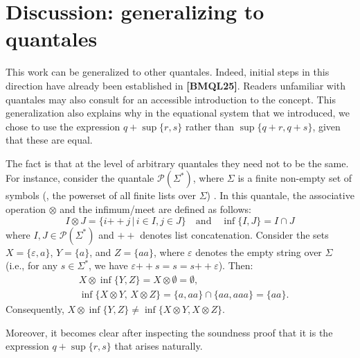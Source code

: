 \section{Discussion: generalizing to quantales}



This work can be generalized to other quantales. Indeed, initial steps in this direction have already been established in \textbf{[BMQL25]}.   Readers unfamiliar with quantales may also consult \cite{STUBBE201495} for an accessible introduction to the concept.
This generalization also explains why in the equational system that we introduced, we chose to use the expression \( q + \sup\{r, s\} \) rather than \( \sup\{q + r, q + s\} \), given that these are equal.

The fact is that at the level of arbitrary quantales they need not to be the same. For instance, consider the quantale \(\mathcal{P}(\Sigma^*)\), where \(\Sigma\) is a finite non-empty set of symbols (\ie, the powerset of all finite lists over \(\Sigma\)) \cite{STUBBE201495}. In this quantale, the associative operation \(\otimes\) and the infimum/meet are defined as follows:
\[ I \otimes J =  \{ i \mathbin{+\!+} j \,|\, i \in I, j \in J \} \quad \text{and} \quad \inf \{ I, J\} = I \cap  J  \]
where \(I, J \in \mathcal{P}(\Sigma^*)\) and \(\mathbin{+\!+}\) denotes list concatenation.
Consider the sets $X = \{\varepsilon, a\}$, $Y = \{a\}$, and $Z = \{aa\}$, where $\varepsilon$ denotes the empty string over $\Sigma$ (i.e., for any $s \in \Sigma^*$, we have $\varepsilon \mathbin{+\!+} s = s = s \mathbin{+\!+} \varepsilon$). Then:
\begin{align*}
  & X \otimes \inf\{Y, Z\} = X \otimes \emptyset = \emptyset, \\
  &\inf\{X \otimes Y,\, X \otimes Z\} =  \{a, aa\} \cap \{aa, aaa\} = \{aa\}.
\end{align*}
Consequently, $X \otimes \inf\{Y,Z\} \neq  \inf\{X \otimes Y, X \otimes Z \}.$

Moreover, it becomes clear after inspecting the soundness proof that it is the expression \( q + \sup\{r, s\} \) that arises naturally. 

